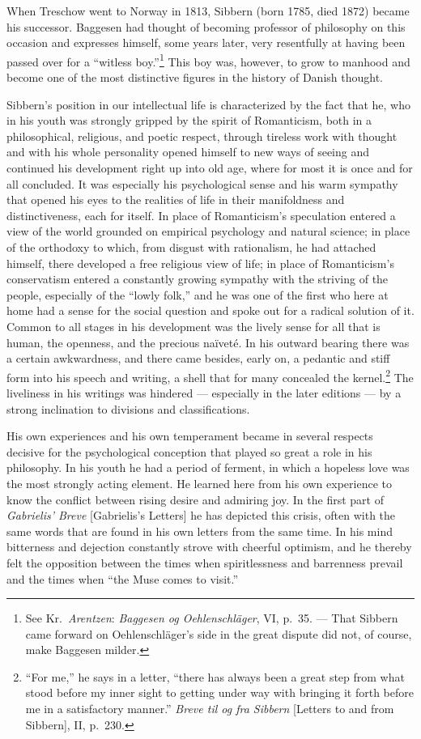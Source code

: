 \documentclass[12pt,a4paper]{book}
\newcommand{\opage}[1]{\marginnote{\footnotesize\textit{[#1]}}}
\begin{document}
\noindent \opage{97}When Treschow went to Norway in 1813, Sibbern (born 1785, died 1872) became
his successor. Baggesen had thought of becoming professor of philosophy on this occasion
and expresses himself, some years later, very resentfully at having been passed over for
a ``witless boy.''\footnote{See Kr.\ \emph{Arentzen}: \emph{Baggesen og Oehlenschläger}, VI,
p.~35. --- That Sibbern came forward on Oehlenschläger's side in the great dispute did
not, of course, make Baggesen milder.} This boy was, however, to grow to manhood and
become one of the most distinctive figures in the history of Danish thought.

Sibbern's position in our intellectual life is characterized by the fact that he, who in
his youth was strongly gripped by the spirit of Romanticism, both in a philosophical,
religious, and poetic respect, through tireless work with thought and with his whole
personality opened himself to new ways of seeing and continued his development right up
into old age, where for most it is once and for all concluded. It was especially his
psychological sense and his warm sympathy that opened his eyes to the realities of life
in their manifoldness and distinctiveness, each for itself. In place of Romanticism's
speculation entered a view of the world grounded on empirical psychology and natural
science; in place of the orthodoxy to which, from disgust with rationalism, he had
attached himself, there developed a free religious view of life; in place of
Romanticism's conservatism entered a constantly growing sympathy with the striving of
the people, especially of the ``lowly folk,'' and he was one of the first who here \opage{98}at
home had a sense for the social question and spoke out for a radical solution of it.
Common to all stages in his development was the lively sense for all that is human, the
openness, and the precious naïveté. In his outward bearing there was a certain
awkwardness, and there came besides, early on, a pedantic and stiff form into his speech
and writing, a shell that for many concealed the kernel.\footnote{``For me,'' he says in
a letter, ``there has always been a great step from what stood before my inner sight to
getting under way with bringing it forth before me in a satisfactory manner.'' \emph{Breve
til og fra Sibbern} [Letters to and from Sibbern], II, p.~230.} The liveliness in his
writings was hindered --- especially in the later editions --- by a strong inclination to
divisions and classifications.

His own experiences and his own temperament became in several respects decisive for the
psychological conception that played so great a role in his philosophy. In his youth he
had a period of ferment, in which a hopeless love was the most strongly acting element.
He learned here from his own experience to know the conflict between rising desire and
admiring joy. In the first part of \emph{Gabrielis' Breve} [Gabrielis's Letters] he has
depicted this crisis, often with the same words that are found in his own letters from
the same time. In his mind bitterness and dejection constantly strove with cheerful
optimism, and he thereby felt the opposition between the times when spiritlessness and
barrenness prevail and the times when ``the Muse comes to visit.''
\end{document}
